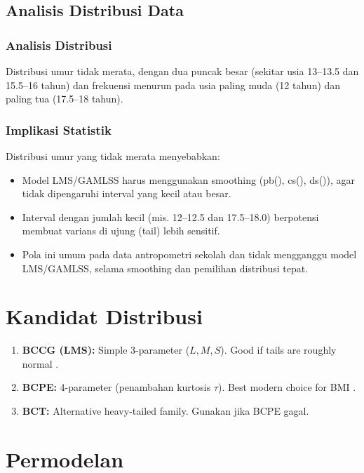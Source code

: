 \documentclass[11pt, a4paper]{article}
\begin{document}
\subsection{Analisis Distribusi Data}
\subsubsection{Analisis Distribusi}
Distribusi umur tidak merata, dengan dua puncak besar (sekitar usia 13–13.5 dan 15.5–16 tahun) dan frekuensi menurun pada usia paling muda (12 tahun) dan paling tua (17.5–18 tahun).

\subsubsection{Implikasi Statistik}
Distribusi umur yang tidak merata menyebabkan:
\begin{itemize}
    \item Model LMS/GAMLSS harus menggunakan smoothing (pb(), cs(), ds()), agar tidak dipengaruhi interval yang kecil atau besar.
    \item Interval dengan jumlah kecil (mis. 12–12.5 dan 17.5–18.0) berpotensi membuat varians di ujung (tail) lebih sensitif.
    \item Pola ini umum pada data antropometri sekolah dan tidak mengganggu model LMS/GAMLSS, selama smoothing dan pemilihan distribusi tepat.
\end{itemize}

\section{Kandidat Distribusi}
\begin{enumerate}
    \item \textbf{BCCG (LMS):} Simple 3-parameter ($L, M, S$). Good if tails are roughly normal \citep{cole1992}.
    \item \textbf{BCPE:} 4-parameter (penambahan kurtosis $\tau$). Best modern choice for BMI \citep{rigby2004}.
    \item \textbf{BCT:} Alternative heavy-tailed family. Gunakan jika BCPE gagal.
\end{enumerate}

\section{Permodelan}
\end{document}
